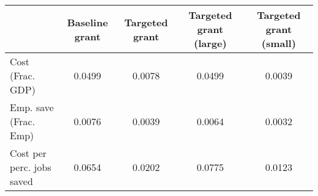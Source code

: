  \begin{tabular}{lcccc} \hline \hline 
  & Baseline grant & Targeted grant & Targeted grant (large) & Targeted grant (small) \\ 
 \hline  
 Cost (Frac. GDP) &   0.0499 &   0.0078 &   0.0499 &   0.0039 \\ 
 Emp. save (Frac. Emp) &   0.0076 &   0.0039 &   0.0064 &   0.0032 \\ 
 Cost per perc. jobs saved &   0.0654 &   0.0202 &   0.0775 &   0.0123 \\ 
\hline \hline 
 \end{tabular} 
